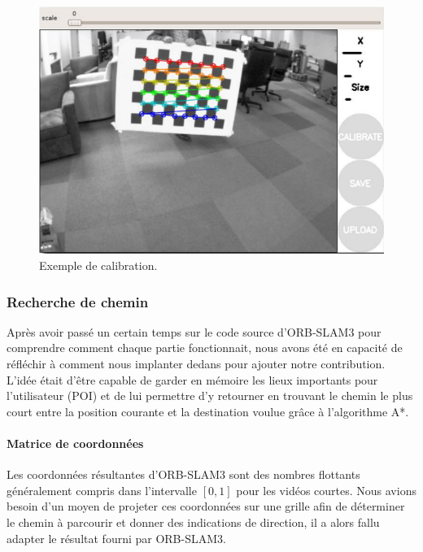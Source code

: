 \documentclass[11pt]{article}
\begin{document}
        \begin{figure}[hbt]  
          \includegraphics[width=\textwidth]{Calibration.png}    
          \caption{Exemple de calibration.}
          \label{fig:Calibration}
        \end{figure}

      \subsubsection{Recherche de chemin}
        Après avoir passé un certain temps sur le code source d'ORB-SLAM3 pour comprendre comment chaque partie fonctionnait, nous avons
        été en capacité de réfléchir à comment nous implanter dedans pour ajouter notre contribution. L'idée était d'être capable de garder
        en mémoire les lieux importants pour l'utilisateur (POI) et de lui permettre d'y retourner en trouvant le chemin le plus court
        entre la position courante et la destination voulue grâce à l'algorithme A*.    

        \paragraph{Matrice de coordonnées}
          Les coordonnées résultantes d'ORB-SLAM3 sont des nombres flottants généralement compris dans l'intervalle $[0,1]$ pour les vidéos
          courtes. Nous avions besoin d'un moyen de projeter ces coordonnées sur une grille afin de déterminer le chemin à parcourir
          et donner des indications de direction, il a alors fallu adapter le résultat fourni par ORB-SLAM3.

        \pagebreak
\end{document}
